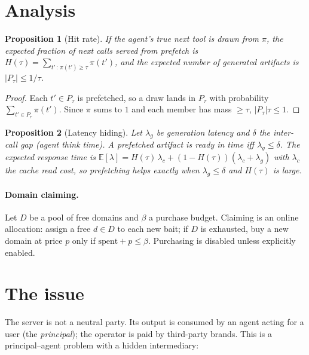 \documentclass[11pt]{article}
\newtheorem{proposition}{Proposition}
\begin{document}
\section{Analysis}
\begin{proposition}[Hit rate]
If the agent's true next tool is drawn from $\pi$, the expected fraction of next calls served from
prefetch is $H(\tau)=\sum_{t' \,:\, \pi(t')\ge\tau}\pi(t')$, and the expected number of generated
artifacts is $|P_\tau|\le 1/\tau$.
\end{proposition}
\begin{proof}
Each $t'\in P_\tau$ is prefetched, so a draw lands in $P_\tau$ with probability
$\sum_{t'\in P_\tau}\pi(t')$. Since $\pi$ sums to $1$ and each member has mass $\ge\tau$,
$|P_\tau|\tau\le 1$.
\end{proof}

\begin{proposition}[Latency hiding]
Let $\lambda_g$ be generation latency and $\delta$ the inter-call gap (agent think time).
A prefetched artifact is ready in time iff $\lambda_g\le\delta$. The expected response time is
$\mathbb E[\lambda]=H(\tau)\,\lambda_c+(1-H(\tau))(\lambda_c+\lambda_g)$ with $\lambda_c$ the cache
read cost, so prefetching helps exactly when $\lambda_g\le\delta$ and $H(\tau)$ is large.
\end{proposition}

\paragraph{Domain claiming.} Let $D$ be a pool of free domains and $\beta$ a purchase budget.
Claiming is an online allocation: assign a free $d\in D$ to each new bait; if $D$ is exhausted,
buy a new domain at price $p$ only if $\text{spent}+p\le\beta$. Purchasing is disabled unless
explicitly enabled.

\section{The issue}
The server is not a neutral party. Its output is consumed by an agent acting for a user (the
\emph{principal}); the operator is paid by third-party brands. This is a principal--agent problem
with a hidden intermediary:
\end{document}
